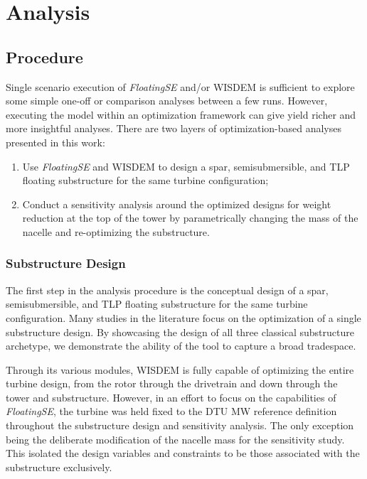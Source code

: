 \chapter{Analysis}
\label{sec:opt}

\section{Procedure}
Single scenario execution of \textit{FloatingSE} and/or WISDEM is
sufficient to explore some simple one-off or comparison analyses between
a few runs.  However, executing the model within an optimization
framework can give yield richer and more insightful analyses.  There are
two layers of optimization-based analyses presented in this work:

\begin{enumerate}
\item Use \textit{FloatingSE} and WISDEM to design a spar,
  semisubmersible, and TLP floating substructure for the same turbine
  configuration;
\item Conduct a sensitivity analysis around the optimized designs for
  weight reduction at the top of the tower by parametrically changing
  the mass of the nacelle and re-optimizing the substructure.
\end{enumerate}

\subsection{Substructure Design}
The first step in the analysis procedure is the conceptual design of a
spar, semisubmersible, and TLP floating substructure for the same
turbine configuration.  Many studies in the literature focus on the
optimization of a single substructure design.  By showcasing the design
of all three classical substructure archetype, we demonstrate the ability
of the tool to capture a broad tradespace.

Through its various modules, WISDEM is fully capable of optimizing the
entire turbine design, from the rotor through the drivetrain and down
through the tower and substructure.  However, in an effort to focus on
the capabilities of \textit{FloatingSE}, the turbine was held fixed to
the DTU \unit[10]{MW} reference definition throughout the substructure
design and sensitivity analysis.  The only exception being the
deliberate modification of the nacelle mass for the sensitivity study.
This isolated the design variables and constraints to be those
associated with the substructure exclusively.

